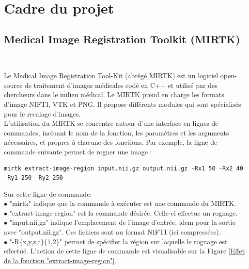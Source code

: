 \documentclass[10pt]{report}
\begin{document}
	\section{Cadre du projet} 
	\subsection{Medical Image Registration Toolkit (MIRTK)}~\par
	Le Medical Image Registration Tool-Kit (abrégé MIRTK) est un logiciel open-source de traitement d'images médicales codé en C++ et utilisé par des chercheurs dans le milieu médical. Le MIRTK prend en charge les formats d'image NIFTI, VTK et PNG. Il propose différents modules qui sont spécialisés pour le recalage d'images. \\ 
	L'utilisation du MIRTK se concentre autour d'une interface en lignes de commandes, incluant le nom de la fonction, les paramètres et les arguments nécessaires, et propres à chacune des fonctions. Par exemple, la ligne de commande suivante permet de rogner une image :
	
	\begin{lstlisting}
mirtk extract-image-region input.nii.gz output.nii.gz -Rx1 50 -Rx2 40 -Ry1 250 -Ry2 250
	\end{lstlisting}
	
	Sur cette ligne de commande:
	\\{$\bullet$} "mirtk" indique que la commande à exécuter est une commande du MIRTK.
	\\{$\bullet$} "extract-image-region" est la commande désirée. Celle-ci effectue un rognage.
	\\{$\bullet$} "input.nii.gz" indique l'emplacement de l'image d'entrée, idem pour la sortie avec "output.nii.gz". Ces fichiers sont au format NIFTI (ici compressées).
	\\{$\bullet$} "-R{$\lbrace$}x,y,z,t{$\rbrace$}{$\lbrace$}1,2{$\rbrace$}" permet de spécifier la région sur laquelle le rognage est effectué. 
	L'action de cette ligne de commande est visualisable sur la Figure \ref{Effet de la fonction "extract-image-region"}.
	
\end{document}
